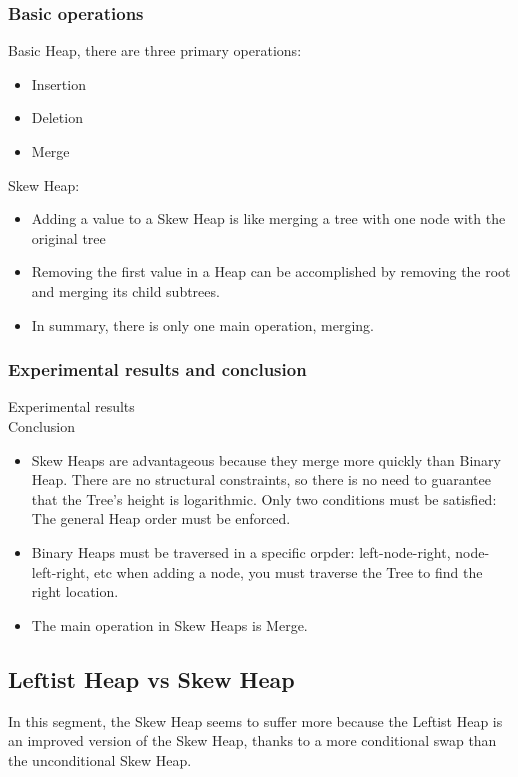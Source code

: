 \documentclass[12pt, a4paper]{article}
\begin{document}
\subsubsection{Basic operations}

Basic Heap, there are three primary operations:
\begin{itemize}
    \item Insertion
    \item Deletion
    \item Merge
\end{itemize}
Skew Heap:
\begin{itemize}
    \item Adding a value to a Skew Heap is like merging a tree with one node with the original tree
    \item Removing the first value in a Heap can be accomplished by removing the root and merging its child subtrees.
    \item In summary, there is only one main operation, merging.
\end{itemize}

\subsubsection{Experimental results and conclusion}
Experimental results\\
Conclusion
\begin{itemize}
    \item Skew Heaps are advantageous because they merge more quickly than Binary Heap. There are no structural constraints, so there is no need to guarantee that the Tree's height is logarithmic. Only two conditions must be satisfied: The general Heap order must be enforced.
    \item Binary Heaps must be traversed in a specific orpder: left-node-right, node-left-right, etc when adding a node, you must traverse the Tree to find the right location.
    \item The main operation in Skew Heaps is Merge.
\end{itemize}


\subsection{Leftist Heap vs Skew Heap}
In this segment, the Skew Heap seems to suffer more because the Leftist Heap is an improved version of the Skew Heap, thanks to a more conditional swap than the unconditional Skew Heap. \\
\end{document}
